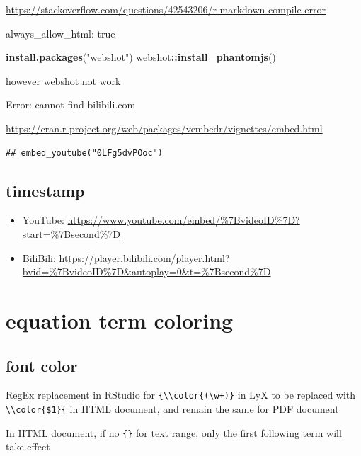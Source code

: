 \documentclass[
]{book}
\newenvironment{Shaded}{\begin{snugshade}}{\end{snugshade}}
\newcommand{\FunctionTok}[1]{\textcolor[rgb]{0.13,0.29,0.53}{\textbf{#1}}}
\newcommand{\NormalTok}[1]{#1}
\newcommand{\SpecialCharTok}[1]{\textcolor[rgb]{0.81,0.36,0.00}{\textbf{#1}}}
\newcommand{\StringTok}[1]{\textcolor[rgb]{0.31,0.60,0.02}{#1}}
\providecommand{\tightlist}{%
  \setlength{\itemsep}{0pt}\setlength{\parskip}{0pt}}
\theoremstyle{definition}
\theoremstyle{definition}
\theoremstyle{definition}
\theoremstyle{definition}
\theoremstyle{remark}
\begin{document}
\url{https://stackoverflow.com/questions/42543206/r-markdown-compile-error}

always\_allow\_html: true

\begin{Shaded}
\begin{Highlighting}[]
\FunctionTok{install.packages}\NormalTok{(}\StringTok{"webshot"}\NormalTok{)}
\NormalTok{webshot}\SpecialCharTok{::}\FunctionTok{install\_phantomjs}\NormalTok{()}
\end{Highlighting}
\end{Shaded}

however webshot not work

Error: cannot find bilibili.com

\url{https://cran.r-project.org/web/packages/vembedr/vignettes/embed.html}

\begin{verbatim}
## embed_youtube("0LFg5dvPOoc")
\end{verbatim}

\subsection{timestamp}\label{timestamp}

\begin{itemize}
\tightlist
\item
  YouTube: \url{https://www.youtube.com/embed/\%7BvideoID\%7D?start=\%7Bsecond\%7D}
\item
  BiliBili: \url{https://player.bilibili.com/player.html?bvid=\%7BvideoID\%7D&autoplay=0&t=\%7Bsecond\%7D}
\end{itemize}

\section{equation term coloring}\label{equation-term-coloring}

\subsection{font color}\label{font-color}

RegEx replacement in RStudio for \texttt{\{\textbackslash{}\textbackslash{}color\{(\textbackslash{}w+)\}} in LyX to be replaced with \texttt{\textbackslash{}\textbackslash{}color\{\$1\}\{} in HTML document, and remain the same for PDF document

In HTML document, if no \texttt{\{\}} for text range, only the first following term will take effect
\end{document}
